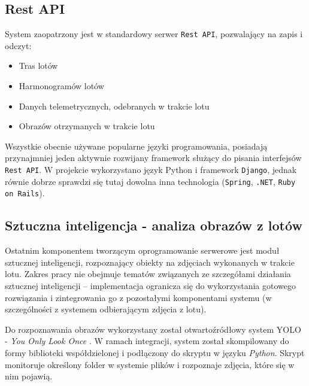
\subsection{Rest API}

System zaopatrzony jest w standardowy serwer
\texttt{Rest API}\cite{principled_design_of_modern_web_apps},
pozwalający na zapis i odczyt:

\begin{itemize}
	\item Tras lotów
	\item Harmonogramów lotów
	\item Danych telemetrycznych, odebranych w trakcie lotu
	\item Obrazów otrzymanych w trakcie lotu
\end{itemize}

Wszystkie obecnie używane popularne języki programowania,
posiadają przynajmniej jeden aktywnie rozwijany framework 
służący do pisania interfejsów \texttt{Rest API}. W projekcie
wykorzystano język Python i framework \texttt{Django},
jednak równie dobrze sprawdzi się tutaj dowolna inna technologia
(\texttt{Spring}, \texttt{.NET}, \texttt{Ruby on Rails}).

\subsection{Sztuczna inteligencja - analiza obrazów z lotów}

Ostatnim komponentem tworzącym oprogramowanie serwerowe jest moduł sztucznej inteligencji,
rozpoznający obiekty na zdjęciach wykonanych w trakcie lotu. Zakres pracy nie obejmuje
tematów związanych ze szczegółami działania sztucznej inteligencji -- implementacja
ogranicza się do wykorzystania gotowego rozwiązania i zintegrowania
go z pozostałymi komponentami systemu (w szczególności z systemem
odbierającym zdjęcia z lotu).

Do rozpoznawania obrazów wykorzystany został otwartoźródłowy system
YOLO - \textit{You Only Look Once} \cite{yolo}. W ramach integracji, system został
skompilowany do formy biblioteki współdzielonej i podłączony do skryptu
w języku \textit{Python}. Skrypt monitoruje określony folder w systemie plików
i rozpoznaje zdjęcia, które się w nim pojawią.


